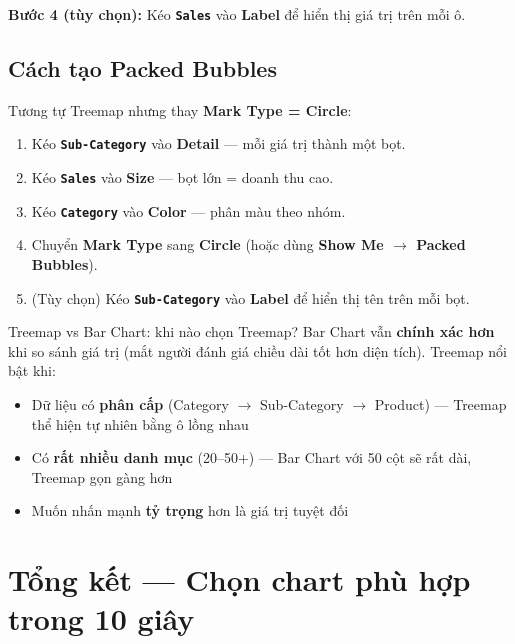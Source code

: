 \documentclass[12pt]{article}
\begin{document}
\noindent \textbf{Bước 4 (tùy chọn):} Kéo \textbf{\texttt{Sales}} vào \textbf{Label} để hiển thị giá trị trên mỗi ô.

\subsection{Cách tạo Packed Bubbles}

\noindent Tương tự Treemap nhưng thay \textbf{Mark Type = Circle}:

\begin{enumerate}[nosep]
    \item Kéo \textbf{\texttt{Sub-Category}} vào \textbf{Detail} --- mỗi giá trị thành một bọt.
    \item Kéo \textbf{\texttt{Sales}} vào \textbf{Size} --- bọt lớn = doanh thu cao.
    \item Kéo \textbf{\texttt{Category}} vào \textbf{Color} --- phân màu theo nhóm.
    \item Chuyển \textbf{Mark Type} sang \textbf{Circle} (hoặc dùng \textbf{Show Me $\rightarrow$ Packed Bubbles}).
    \item (Tùy chọn) Kéo \textbf{\texttt{Sub-Category}} vào \textbf{Label} để hiển thị tên trên mỗi bọt.
\end{enumerate}

\begin{tipbox}{Treemap vs Bar Chart: khi nào chọn Treemap?}
Bar Chart vẫn \textbf{chính xác hơn} khi so sánh giá trị (mắt người đánh giá chiều dài tốt hơn diện tích). Treemap nổi bật khi:
\begin{itemize}[nosep]
    \item Dữ liệu có \textbf{phân cấp} (Category $\rightarrow$ Sub-Category $\rightarrow$ Product) --- Treemap thể hiện tự nhiên bằng ô lồng nhau
    \item Có \textbf{rất nhiều danh mục} (20--50+) --- Bar Chart với 50 cột sẽ rất dài, Treemap gọn gàng hơn
    \item Muốn nhấn mạnh \textbf{tỷ trọng} hơn là giá trị tuyệt đối
\end{itemize}
\end{tipbox}

\section{Tổng kết --- Chọn chart phù hợp trong 10 giây}
\end{document}
